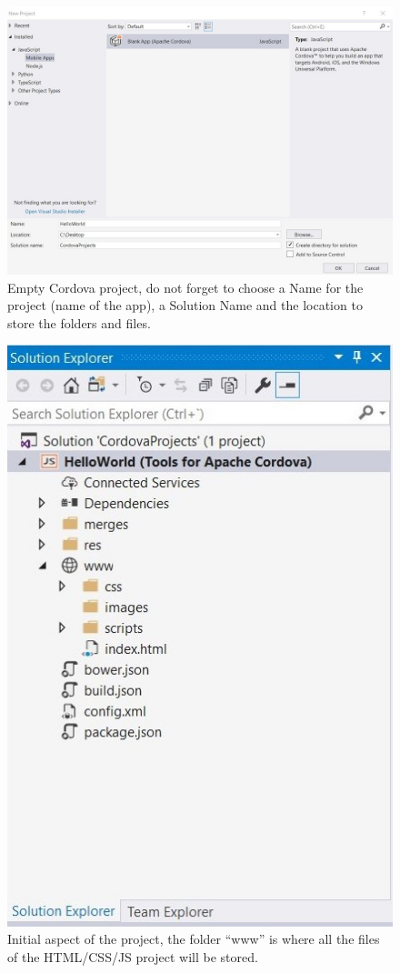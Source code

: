 \begin{figure}
    \centering
    \includegraphics[width= 0.9 \textwidth]{Figures/Cordova2}
    \caption{Empty Cordova project, do not forget to choose a Name for the project (name of the app), a Solution Name and the location to store the folders and files.}
    \label{fig:Cordova2}
\end{figure}

\begin{figure}
    \centering
    \includegraphics[width= 0.6 \textwidth]{Figures/Cordova3}
    \caption{Initial aspect of the project, the folder ``www'' is where all the files of the HTML/CSS/JS project will be stored.}
    \label{fig:Cordova3}
\end{figure}

